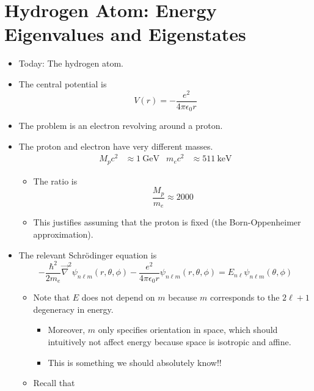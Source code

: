 \documentclass[../notes.tex]{subfiles}
\begin{document}
\section{Hydrogen Atom: Energy Eigenvalues and Eigenstates}
\begin{itemize}
    \item {}Today: The hydrogen atom.
    \item The central potential is
    \begin{equation*}
        V(r) = -\frac{e^2}{4\pi\epsilon_0r}
    \end{equation*}
    \item The problem is an electron revolving around a proton.
    \item The proton and electron have very different masses.
    \begin{align*}
        M_pc^2 &\approx \SI{1}{\giga\electronvolt}&
        m_ec^2 &\approx \SI{511}{\kilo\electronvolt}
    \end{align*}
    \begin{itemize}
        \item The ratio is
        \begin{equation*}
            \frac{M_p}{m_e} \approx 2000
        \end{equation*}
        \item This justifies assuming that the proton is fixed (the Born-Oppenheimer approximation).
    \end{itemize}
    \item The relevant Schr\"{o}dinger equation is
    \begin{equation*}
        -\frac{\hbar^2}{2m_e}\vec{\nabla}^2\psi_{n\ell m}(r,\theta,\phi)-\frac{e^2}{4\pi\epsilon_0r}\psi_{n\ell m}(r,\theta,\phi) = E_{n\ell}\psi_{n\ell m}(\theta,\phi)
    \end{equation*}
    \begin{itemize}
        \item Note that $E$ does not depend on $m$ because $m$ corresponds to the $2\ell+1$ degeneracy in energy.
        \begin{itemize}
            \item Moreover, $m$ only specifies orientation in space, which should intuitively not affect energy because space is isotropic and affine.
            \item This is something we should absolutely know!!
        \end{itemize}
        \item Recall that

\end{itemize}
\end{itemize}
\end{document}
